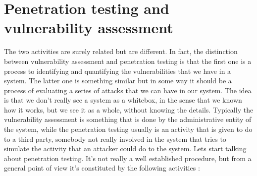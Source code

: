 \documentclass[11pt]{article}
\begin{document}
\section{Penetration testing and vulnerability assessment}
The two activities are surely related but are different. In fact, the distinction between vulnerability assessment and penetration testing is that the first one is a process to identifying and quantifying the vulnerabilities that we have in a system. The latter one is something similar but in some way it should be a process of evaluating a series of attacks that we can have in our system. The idea is that we don't really see a system as a whitebox, in the sense that we known how it works, but we see it as a whole, without knowing the details. Typically the vulnerability assessment is something that is done by the administrative entity of the system, while the penetration testing usually is an activity that is given to do to a third party, somebody not really involved in the system that tries to simulate the activity that an attacker could do to the system. Lets start talking about penetration testing. It's not really a well established procedure, but from a general point of view it's constituted by the following activities :
\end{document}
